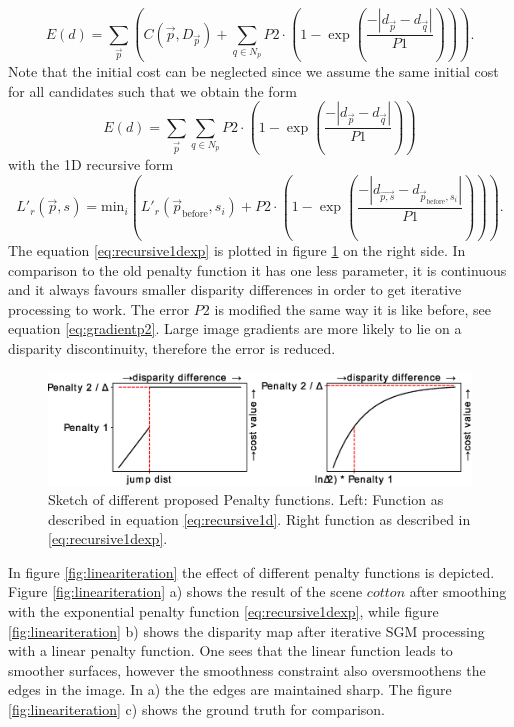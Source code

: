 \documentclass  [
  paper    = a4,
  BCOR     = 10mm,
  twoside,
  fontsize = 12pt,
  fleqn,
  toc      = bibnumbered,
  toc      = listofnumbered,
  numbers  = noendperiod,
  headings = normal,
  listof   = leveldown,
  version  = 3.03
]                                       {scrreprt}
\begin{document}
\begin{equation}\label{eq:global_sgm_function}
E(d) = \sum_{\vec p} \left(C(\vec{p}, D_{\vec p}) + \sum_{q\in N_p} 
P2\cdot \left(1- \exp\left(\frac{-|d_{\vec{p}} - d_{\vec{q}}|}{P1}\right)\right)
\right).
\end{equation}
Note that the initial cost can be neglected since we assume the same initial cost for all candidates such that we obtain the form
\begin{equation}\label{eq:global_sgm_function_wo}
E(d) = \sum_{\vec p}\sum_{q\in N_p} 
P2\cdot \left(1- \exp\left(\frac{-|d_{\vec{p}} - d_{\vec{q}}|}{P1}\right)\right)
\end{equation}
with the 1D recursive form
\begin{equation}\label{eq:recursive1dexp}
L'_r(\vec{p}, s) = \text{min}_i\left( L'_r(\vec{p}_\text{before}, s_i) + P2\cdot \left(1- \exp\left(\frac{-|d_{\vec{p,s}} - d_{\vec{p}_\text{before}, s_i}|}{P1}\right)\right)\right).
\end{equation}
The equation \ref{eq:recursive1dexp} is plotted in figure \ref{fig:penaltyfunction} on the right side. In comparison to the old penalty function it has one less parameter, it is continuous and it always favours smaller disparity differences in order to get iterative processing to work. The error $P2$ is modified the same way it is like before, see equation \ref{eq:gradientp2}. Large image gradients are more likely to lie on a disparity discontinuity, therefore the error is reduced.
\begin{figure}
	\centering
	\includegraphics[width=1\linewidth]{images/penalty_function}
	\caption[Penalty function]{Sketch of different proposed Penalty functions. Left: Function as described in equation \ref{eq:recursive1d}. Right function as described in \ref{eq:recursive1dexp}.}
	\label{fig:penaltyfunction}
\end{figure}
In figure \ref{fig:lineariteration} the effect of different penalty functions is depicted. Figure \ref{fig:lineariteration} a) shows the result of the scene $cotton$ after smoothing with the exponential penalty function \ref{eq:recursive1dexp}, while figure \ref{fig:lineariteration} b) shows the disparity map after iterative SGM processing with a linear penalty function. One sees that the linear function leads to smoother surfaces, however the smoothness constraint also oversmoothens the edges in the image. In a) the the edges are maintained sharp. The figure \ref{fig:lineariteration} c) shows the ground truth for comparison. 
\end{document}
